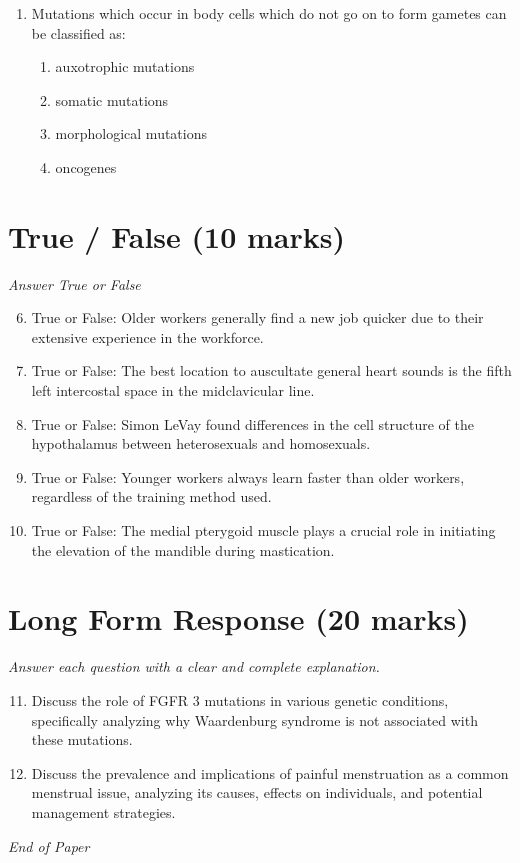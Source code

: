\documentclass[12pt]{article}
\begin{document}
\begin{enumerate}[label=\arabic*.]
\begin{enumerate}[label=(\alph*)]
    \item all of the above
\end{enumerate}
\item Mutations which occur in body cells which do not go on to form gametes can be classified as:
\begin{enumerate}[label=(\alph*)]
    \item auxotrophic mutations
    \item somatic mutations
    \item morphological mutations
    \item oncogenes
\end{enumerate}
\end{enumerate}

\section*{True / False (10 marks)}
\textit{Answer True or False}
\begin{enumerate}[label=\arabic*.]
\setcounter{enumi}{5}
\item True or False: Older workers generally find a new job quicker due to their extensive experience in the workforce.
\item True or False: The best location to auscultate general heart sounds is the fifth left intercostal space in the midclavicular line.
\item True or False: Simon LeVay found differences in the cell structure of the hypothalamus between heterosexuals and homosexuals.
\item True or False: Younger workers always learn faster than older workers, regardless of the training method used.
\item True or False: The medial pterygoid muscle plays a crucial role in initiating the elevation of the mandible during mastication.
\end{enumerate}

\section*{Long Form Response (20 marks)}
\textit{Answer each question with a clear and complete explanation.}
\begin{enumerate}[label=\arabic*.]
\setcounter{enumi}{10}
\item Discuss the role of FGFR 3 mutations in various genetic conditions, specifically analyzing why Waardenburg syndrome is not associated with these mutations.
\item Discuss the prevalence and implications of painful menstruation as a common menstrual issue, analyzing its causes, effects on individuals, and potential management strategies.
\end{enumerate}

\vfill
\noindent\textit{End of Paper}
\end{document}
